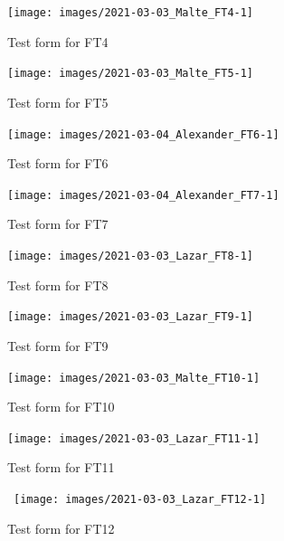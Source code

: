 \documentclass{article}
\begin{document}
 \begin{figure}
     \centering
      \texttt{[image: images/2021-03-03\_Malte\_FT4-1]}
     \renewcommand\figurename{Figure}
     \caption{Test form for FT4}
     \label{fig:my_label}
 \end{figure}

\begin{figure}
     \centering
      \texttt{[image: images/2021-03-03\_Malte\_FT5-1]}
     \renewcommand\figurename{Figure}
     \caption{Test form for FT5}
     \label{fig:my_label}
 \end{figure}
 
 \begin{figure}
     \centering
     \texttt{[image: images/2021-03-04\_Alexander\_FT6-1]}
     \renewcommand\figurename{Figure}
     \caption{Test form for FT6}
     \label{fig:my_label}
 \end{figure}
 
 \begin{figure}
     \centering
      \texttt{[image: images/2021-03-04\_Alexander\_FT7-1]}
     \renewcommand\figurename{Figure}
     \caption{Test form for FT7}
     \label{fig:my_label}
 \end{figure}
 
 \begin{figure}
     \centering
     \texttt{[image: images/2021-03-03\_Lazar\_FT8-1]}
     \renewcommand\figurename{Figure}
     \caption{Test form for FT8}
     \label{fig:my_label}
 \end{figure}
 
 \begin{figure}
     \centering
      \texttt{[image: images/2021-03-03\_Lazar\_FT9-1]}
     \renewcommand\figurename{Figure}
     \caption{Test form for FT9}
     \label{fig:my_label}
 \end{figure}
 
 \begin{figure}
     \centering
      \texttt{[image: images/2021-03-03\_Malte\_FT10-1]}
     \renewcommand\figurename{Figure}
     \caption{Test form for FT10}
     \label{fig:my_label}
 \end{figure}
 
 \begin{figure}
     \centering
     \texttt{[image: images/2021-03-03\_Lazar\_FT11-1]}
     \renewcommand\figurename{Figure}
     \caption{Test form for FT11}
     \label{fig:my_label}
 \end{figure}
 
 \begin{figure}
     \centering
     \ \texttt{[image: images/2021-03-03\_Lazar\_FT12-1]}
     \renewcommand\figurename{Figure}
     \caption{Test form for FT12}
     \label{fig:my_label}
 \end{figure}
 
\end{document}
